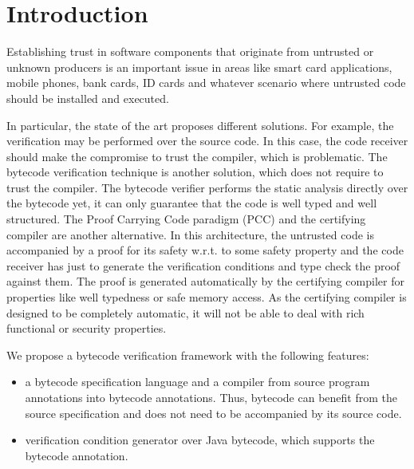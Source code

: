 
\section{Introduction}\label{intro}
Establishing trust in software components that originate from untrusted or unknown producers is an important issue in areas like smart card applications, mobile phones, bank cards, ID cards and whatever scenario where untrusted code should be installed and executed.

 In particular, the state of the art proposes different solutions. 
For example, the verification may be performed over the source code. 
In this case, the code receiver should make the compromise to trust the compiler, which is problematic. 
The bytecode verification technique \cite{Ljbc} is another solution, which does not require to trust the compiler. 
The bytecode verifier performs the static analysis directly over the bytecode yet, it can only guarantee that 
the code is well typed and well structured. %
The Proof Carrying Code paradigm (PCC) and the certifying compiler \cite{ComNec,DesNecLee98} are another alternative.
 In this architecture, the untrusted code
is accompanied by a proof for its safety w.r.t. to some safety property and the code receiver has just to generate the 
verification conditions and type check the proof against them. 
The proof is generated automatically by the certifying compiler for properties like well typedness or safe memory access. 
As the certifying compiler is designed to be completely automatic, it will not be able to deal with rich functional or security properties. 
 
We propose a bytecode verification framework with the following features:
\begin{itemize}
  \item a bytecode specification language and a compiler from source program annotations into bytecode annotations.
 Thus, bytecode can benefit from the source specification and does not need to be accompanied by its source code. 

   \item verification condition generator over Java bytecode, which supports
the bytecode annotation. 
\end{itemize}


